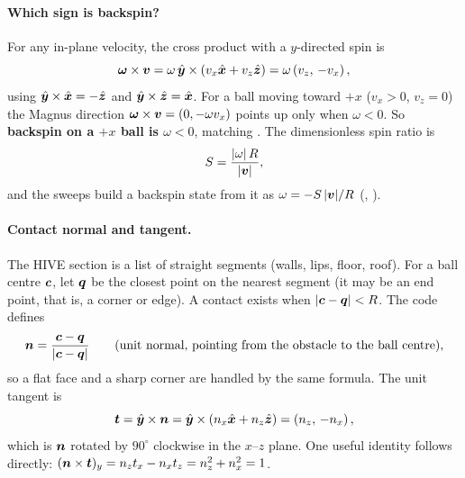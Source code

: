 \paragraph{Which sign is backspin?}
For any in-plane velocity, the cross product with a $y$-directed spin is
\begin{equation}
  \bm{\omega}\times\bm{v}
  = \omega\,\hat{\bm{y}}\times\left(v_x\hat{\bm{x}} + v_z\hat{\bm{z}}\right)
  = \omega\left(v_z,\,-v_x\right),
  \label{eq:contact-omega-cross-v}
\end{equation}
using $\hat{\bm{y}}\times\hat{\bm{x}}=-\hat{\bm{z}}$ and
$\hat{\bm{y}}\times\hat{\bm{z}}=\hat{\bm{x}}$. For a ball moving toward $+x$
($v_x>0$, $v_z=0$) the Magnus direction $\bm{\omega}\times\bm{v}=(0,-\omega v_x)$ points up
only when $\omega<0$. So \textbf{backspin on a $+x$ ball is $\omega<0$}, matching
. The dimensionless spin ratio is
\begin{equation}
  S = \frac{|\omega|\,R}{|\bm{v}|},
  \label{eq:contact-spin-ratio}
\end{equation}
and the sweeps build a backspin state from it as $\omega = -S\,|\bm{v}|/R$
(, ).

\paragraph{Contact normal and tangent.}
The HIVE section is a list of straight segments (walls, lips, floor, roof). For a ball centre
$\bm{c}$, let $\bm{q}$ be the closest point on the nearest segment (it may be an end point,
that is, a corner or edge). A contact exists when $|\bm{c}-\bm{q}|<R$. The code defines
\begin{equation}
  \bm{n} = \frac{\bm{c}-\bm{q}}{|\bm{c}-\bm{q}|}
  \qquad\text{(unit normal, pointing from the obstacle to the ball centre)},
  \label{eq:contact-normal}
\end{equation}
so a flat face and a sharp corner are handled by the same formula. The unit tangent is
\begin{equation}
  \bm{t} = \hat{\bm{y}}\times\bm{n}
  = \hat{\bm{y}}\times\left(n_x\hat{\bm{x}}+n_z\hat{\bm{z}}\right)
  = \left(n_z,\,-n_x\right),
  \label{eq:contact-tangent}
\end{equation}
which is $\bm{n}$ rotated by $90^\circ$ clockwise in the $x$--$z$ plane. One useful identity
follows directly: $(\bm{n}\times\bm{t})_y = n_z t_x - n_x t_z = n_z^2+n_x^2 = 1$.

